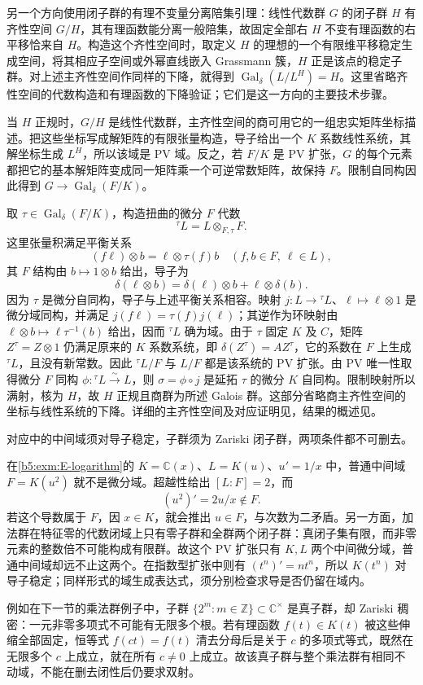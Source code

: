 \begin{proofsketch}
	另一个方向使用闭子群的有理不变量分离陪集引理：线性代数群 \(G\) 的闭子群 \(H\) 有齐性空间 \(G/H\)，其有理函数能分离一般陪集，故固定全部右 \(H\) 不变有理函数的右平移恰来自 \(H\)。构造这个齐性空间时，取定义 \(H\) 的理想的一个有限维平移稳定生成空间，将其相应子空间或外幂直线嵌入 Grassmann 簇，\(H\) 正是该点的稳定子群。对上述主齐性空间作同样的下降，就得到 \(\operatorname{Gal}_\delta(L/L^H)=H\)。这里省略齐性空间的代数构造和有理函数的下降验证；它们是这一方向的主要技术步骤。

	当 \(H\) 正规时，\(G/H\) 是线性代数群，主齐性空间的商可用它的一组忠实矩阵坐标描述。把这些坐标写成解矩阵的有限张量构造，导子给出一个 \(K\) 系数线性系统，其解坐标生成 \(L^H\)，所以该域是 PV 域。反之，若 \(F/K\) 是 PV 扩张，\(G\) 的每个元素都把它的基本解矩阵变成同一矩阵乘一个可逆常数矩阵，故保持 \(F\)。限制自同构因此得到 \(G\to\operatorname{Gal}_\delta(F/K)\)。

	取 \(\tau\in\operatorname{Gal}_\delta(F/K)\)，构造扭曲的微分 \(F\) 代数
	\[
		{}^\tau L=L\otimes_{F,\tau}F.
	\]
	这里张量积满足平衡关系
	\[
		(f\ell)\otimes b=\ell\otimes\tau(f)b \quad(f,b\in F,\ \ell\in L),
	\]
	其 \(F\) 结构由 \(b\mapsto1\otimes b\) 给出，导子为
	\[
		\delta(\ell\otimes b)=\delta(\ell)\otimes b+\ell\otimes\delta(b).
	\]
	因为 \(\tau\) 是微分自同构，导子与上述平衡关系相容。映射 \(j:L\rightarrow{}^\tau L\)、\(\ell\mapsto\ell\otimes1\) 是微分域同构，并满足 \(j(f\ell)=\tau(f)j(\ell)\)；其逆作为环映射由 \(\ell\otimes b\mapsto\ell\tau^{-1}(b)\) 给出，因而 \({}^\tau L\) 确为域。由于 \(\tau\) 固定 \(K\) 及 \(C\)，矩阵 \(Z^\tau=Z\otimes1\) 仍满足原来的 \(K\) 系数系统，即 \(\delta(Z^\tau)=AZ^\tau\)，它的系数在 \(F\) 上生成 \({}^\tau L\)，且没有新常数。因此 \({}^\tau L/F\) 与 \(L/F\) 都是该系统的 PV 扩张。由 PV 唯一性取得微分 \(F\) 同构 \(\phi:{}^\tau L\xrightarrow{\sim}L\)，则 \(\sigma=\phi\circ j\) 是延拓 \(\tau\) 的微分 \(K\) 自同构。限制映射所以满射，核为 \(H\)，故 \(H\) 正规且商群为所述 Galois 群。这部分省略商主齐性空间的坐标与线性系统的下降。详细的主齐性空间及对应证明见\cite[Section 1.4, Theorem 1.28, Proposition 1.34 and Corollary 1.40]{VanDerPutSinger2003GaloisTheory}，结果的概述见\cite[Theorem 1.3.9 and Proposition 1.3.20, pp. 13--17]{Singer2009DifferentialGalois}。
\end{proofsketch}

对应中的中间域须对导子稳定，子群须为 Zariski 闭子群，两项条件都不可删去。

在\cref{b5:exm:E-logarithm}的 \(K=\mathbb C(x)\)、\(L=K(u)\)、\(u'=1/x\) 中，普通中间域 \(F=K(u^2)\) 就不是微分域。超越性给出 \([L:F]=2\)，而
\[
	(u^2)'=2u/x\notin F.
\]
若这个导数属于 \(F\)，因 \(x\in K\)，就会推出 \(u\in F\)，与次数为二矛盾。另一方面，加法群在特征零的代数闭域上只有零子群和全群两个闭子群：真闭子集有限，而非零元素的整数倍不可能构成有限群。故这个 PV 扩张只有 \(K,L\) 两个中间微分域，普通中间域却远不止这两个。在指数型扩张中则有 \((t^n)'=nt^n\)，所以 \(K(t^n)\) 对导子稳定；同样形式的域生成表达式，须分别检查求导是否仍留在域内。

\ProseParagraphBreak
例如在下一节的乘法群例子中，子群 \(\{2^m:m\in\mathbb Z\}\subset\mathbb C^\times\) 是真子群，却 Zariski 稠密：一元非零多项式不可能有无限多个根。若有理函数 \(f(t)\in K(t)\) 被这些伸缩全部固定，恒等式 \(f(ct)=f(t)\) 清去分母后是关于 \(c\) 的多项式等式，既然在无限多个 \(c\) 上成立，就在所有 \(c\ne0\) 上成立。故该真子群与整个乘法群有相同不动域，不能在删去闭性后仍要求双射。
